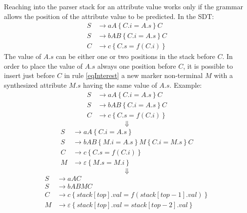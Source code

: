 Reaching into the parser stack for an attribute value works only if the grammar allows the position of the attribute value to be predicted.
In the SDT:
\begin{align}
	S &\to aA \left\{C.i = A.s\right\}C \\
	S &\to bAB \left\{C.i = A.s\right\}C \label{eqInterest}\\
	C &\to c \left\{C.s = f(C.i)\right\}
\end{align}
The value of $A.s$ can be either one or two positions in the stack before $C$.
In order to place the value of $A.s$ always one position before $C$, it is possible to insert just before $C$ in rule \ref{eqInterest} a new marker non-terminal $M$ with a synthesized attribute $M.s$ having the same value of $A.s$.
Example:
\begin{align*}
	S &\to aA \left\{C.i = A.s\right\}C \\
	S &\to bAB \left\{C.i = A.s\right\}C \\
	C &\to c \left\{C.s = f(C.i)\right\}
\end{align*}
$$
	\Downarrow
$$
\begin{align*}
	S &\to aA \left\{C.i = A.s\right\} \\
	S &\to bAB \left\{M.i = A.s\right\}M\left\{C.i = M.s\right\}C \\
	C &\to c \left\{C.s = f(C.i)\right\} \\
	M &\to \varepsilon \left\{M.s = M.i\right\}
\end{align*}
$$
	\Downarrow
$$
\begin{align*}
	S &\to aAC \\
	S &\to bABMC \\
	C &\to c \left\{stack[top].val = f(stack[top - 1].val)\right\} \\
	M &\to \varepsilon \left\{stack[top].val = stack[top - 2].val\right\}
\end{align*}


